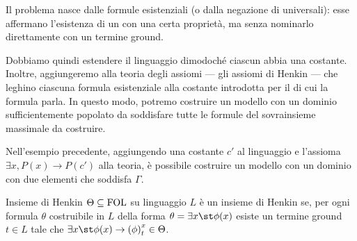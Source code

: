 Il problema nasce dalle formule esistenziali (o dalla negazione di universali): esse affermano l'esistenza di un  con una certa proprietà, ma senza nominarlo direttamente con un termine ground.

Dobbiamo quindi estendere il linguaggio dimodoché ciascun  abbia una costante. Inoltre, aggiungeremo alla teoria degli assiomi --- gli assiomi di Henkin --- che leghino ciascuna formula esistenziale alla costante introdotta per il  di cui la formula parla.
In questo modo, potremo costruire un modello con un dominio sufficientemente popolato da soddisfare tutte le formule del sovrainsieme massimale da costruire.

Nell'esempio precedente, aggiungendo una costante \(c'\) al linguaggio e l'assioma \(\exists x, P(x) \to P(c')\) alla teoria, è possibile costruire un modello con un dominio con due elementi che soddisfa \(\Gamma\).

\begin{definition}{Insieme di Henkin}
  \(\Theta \subseteq \FOL\) su linguaggio \(L\) è un insieme di Henkin se, per ogni formula \(\theta\) costruibile in \(L\) della forma \(\theta = \exists x\st \phi(x)\) esiste un termine ground \(t \in L\) tale che \(\exists x\st \phi(x) \to \subs{\phi}{x}{t} \in \Theta\).
\end{definition}


